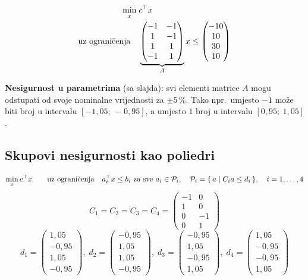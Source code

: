 \[
\begin{aligned}
\min_x \; & c\T x \\
\uzogr & \underbrace{\begin{pmatrix}
-1 & -1 \\ 1 & -1 \\ 1 & 1 \\ -1 & 1
\end{pmatrix}}_{A} x \le
\begin{pmatrix}-10\\10\\30\\10\end{pmatrix}
\end{aligned}
\]

\textbf{Nesigurnost u parametrima} (sa slajda): svi elementi matrice $A$ mogu
odstupati od svoje nominalne vrijednosti za \textbf{$\pm5\,\%$}. Tako npr.\
umjesto $-1$ može biti broj u intervalu $[-1{,}05;\ -0{,}95]$, a umjesto $1$
broj u intervalu $[0{,}95;\ 1{,}05]$.

\subsection{Skupovi nesigurnosti kao poliedri}

\[
\min_x c\T x \qquad \uzogr a_i\T x \le b_i \text{ za sve } a_i \in \mathcal{P}_i,
\quad \mathcal{P}_i = \{\, a \mid C_ia \le d_i \,\}, \quad i = 1,\dots,4
\]
\[
C_1 = C_2 = C_3 = C_4 = \begin{pmatrix}
-1 & 0 \\ 1 & 0 \\ 0 & -1 \\ 0 & 1
\end{pmatrix}
\]
\[
d_1 = \begin{pmatrix}1{,}05\\ -0{,}95\\ 1{,}05\\ -0{,}95\end{pmatrix},\;
d_2 = \begin{pmatrix}-0{,}95\\ 1{,}05\\ 1{,}05\\ -0{,}95\end{pmatrix},\;
d_3 = \begin{pmatrix}-0{,}95\\ 1{,}05\\ -0{,}95\\ 1{,}05\end{pmatrix},\;
d_4 = \begin{pmatrix}1{,}05\\ -0{,}95\\ -0{,}95\\ 1{,}05\end{pmatrix}
\]

